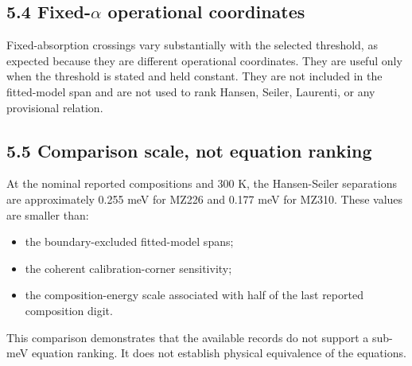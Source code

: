 \subsection{\texorpdfstring{5.4 Fixed-\(\alpha\) operational
coordinates}{5.4 Fixed-\textbackslash alpha operational coordinates}}\label{fixed-alpha-operational-coordinates}

Fixed-absorption crossings vary substantially with the selected
threshold, as expected because they are different operational
coordinates. They are useful only when the threshold is stated and held
constant. They are not included in the fitted-model span and are not
used to rank Hansen, Seiler, Laurenti, or any provisional relation.

\subsection{5.5 Comparison scale, not equation
ranking}\label{comparison-scale-not-equation-ranking}

At the nominal reported compositions and 300 K, the Hansen-Seiler
separations are approximately 0.255 meV for MZ226 and 0.177 meV for
MZ310. These values are smaller than:

\begin{itemize}
\tightlist
\item
  the boundary-excluded fitted-model spans;
\item
  the coherent calibration-corner sensitivity;
\item
  the composition-energy scale associated with half of the last reported
  composition digit.
\end{itemize}

This comparison demonstrates that the available records do not support a
sub-meV equation ranking. It does not establish physical equivalence of
the equations.
